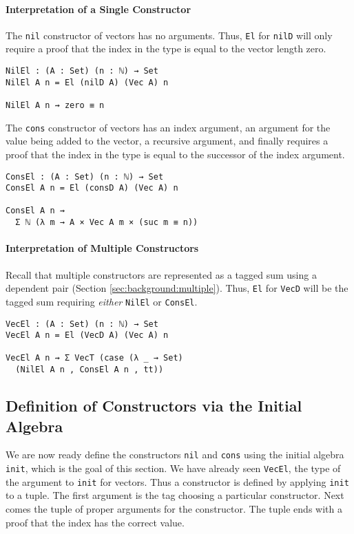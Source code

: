 \documentclass[preprint,nonatbib]{sigplanconf}
\newcommand{\refsec}[1]{Section \ref{sec:#1}}
\begin{document}
\paragraph{Interpretation of a Single Constructor}

The {\tt nil} constructor of vectors has no arguments. Thus,
{\tt El} for {\tt nilD} will only require a proof that the index in
the type is equal to the vector length zero.

\begin{verbatim}
NilEl : (A : Set) (n : ℕ) → Set
NilEl A n = El (nilD A) (Vec A) n

NilEl A n ⇝ zero ≡ n
\end{verbatim}

The {\tt cons} constructor of vectors has an index argument, an
argument for the value being added to the vector, a recursive
argument, and finally requires a proof that the index in the type is
equal to the successor of the index argument.

\begin{verbatim}
ConsEl : (A : Set) (n : ℕ) → Set
ConsEl A n = El (consD A) (Vec A) n

ConsEl A n ⇝
  Σ ℕ (λ m → A × Vec A m × (suc m ≡ n))
\end{verbatim}

\paragraph{Interpretation of Multiple Constructors}

Recall that multiple constructors are represented as a tagged sum
using a dependent pair (\refsec{background:multiple}). Thus,
{\tt El} for {\tt VecD} will be the tagged sum requiring
{\it either} {\tt NilEl} or {\tt ConsEl}.

\begin{verbatim}
VecEl : (A : Set) (n : ℕ) → Set
VecEl A n = El (VecD A) (Vec A) n

VecEl A n ⇝ Σ VecT (case (λ _ → Set)
  (NilEl A n , ConsEl A n , tt))
\end{verbatim}

\subsection{Definition of Constructors via the Initial Algebra}
\label{sec:init:cons}

We are now ready define the constructors {\tt nil} and
{\tt cons} using the initial algebra {\tt init}, which is the goal of
this section.
We have already seen
{\tt VecEl}, the type of the argument to {\tt init} for vectors.
Thus a constructor is defined by applying {\tt init} to a tuple. The
first argument is the tag choosing a particular constructor. Next comes
the tuple of proper arguments for the constructor. The tuple
ends with a proof that the index has the correct value.
\end{document}
